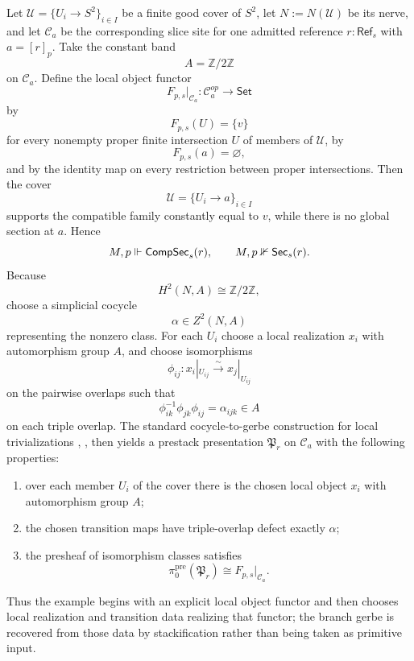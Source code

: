 \begin{example}\label{ex:s2-single-branch-maximal-collapse}
Let $\mathcal U=\{U_i\to S^2\}_{i\in I}$ be a finite good cover of $S^2$, let $N:=N(\mathcal U)$ be its nerve, and let $\mathcal C_a$ be the corresponding slice site for one admitted reference $r:\mathsf{Ref}_s$ with $a=[r]_p$. Take the constant band
\[
A=\mathbb Z/2\mathbb Z
\]
on $\mathcal C_a$. Define the local object functor
\[
F_{p,s}|_{\mathcal C_a}:\mathcal C_a^{op}\to\mathsf{Set}
\]
by
\[
F_{p,s}(U)=\{v\}
\]
for every nonempty proper finite intersection $U$ of members of $\mathcal U$, by
\[
F_{p,s}(a)=\varnothing,
\]
and by the identity map on every restriction between proper intersections. Then the cover
\[
\mathcal U=\{U_i\to a\}_{i\in I}
\]
supports the compatible family constantly equal to $v$, while there is no global section at $a$. Hence
\[
M,p\Vdash \mathsf{CompSec}_s(r),
\qquad
M,p\nVdash \mathsf{Sec}_s(r).
\]
Because
\[
H^2(N,A)\cong \mathbb Z/2\mathbb Z,
\]
choose a simplicial cocycle
\[
\alpha\in Z^2(N,A)
\]
representing the nonzero class. For each $U_i$ choose a local realization $x_i$ with automorphism group $A$, and choose isomorphisms
\[
\phi_{ij}:x_i|_{U_{ij}}\xrightarrow{\sim} x_j|_{U_{ij}}
\]
on the pairwise overlaps such that
\[
\phi_{ik}^{-1}\phi_{jk}\phi_{ij}=\alpha_{ijk}\in A
\]
on each triple overlap. The standard cocycle-to-gerbe construction for local trivializations \cite[Chap.~IV]{Giraud1971}, \cite[Sec.~5]{Breen2006}, \cite{Murray1996} then yields a prestack presentation $\mathfrak P_r$ on $\mathcal C_a$ with the following properties:
\begin{enumerate}[label=(\roman*),nosep]
\item over each member $U_i$ of the cover there is the chosen local object $x_i$ with automorphism group $A$;
\item the chosen transition maps have triple-overlap defect exactly $\alpha$;
\item the presheaf of isomorphism classes satisfies
\[
 \pi_0^{\mathrm{pre}}(\mathfrak P_r)\cong F_{p,s}|_{\mathcal C_a}.
\]
\end{enumerate}
Thus the example begins with an explicit local object functor and then chooses local realization and transition data realizing that functor; the branch gerbe is recovered from those data by stackification rather than being taken as primitive input.


\end{example}
